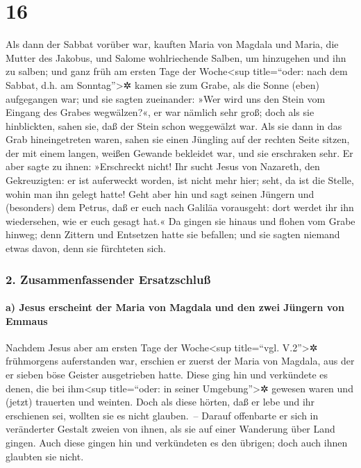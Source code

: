 \hypertarget{section-15}{%
\section{16}\label{section-15}}

 Als dann der Sabbat vorüber war, kauften Maria von
Magdala und Maria, die Mutter des Jakobus, und Salome wohlriechende
Salben, um hinzugehen und ihn zu salben;  und ganz früh am
ersten Tage der Woche\textless sup title=``oder: nach dem Sabbat, d.h.
am Sonntag''\textgreater✲ kamen sie zum Grabe, als die Sonne (eben)
aufgegangen war;  und sie sagten zueinander: »Wer wird uns
den Stein vom Eingang des Grabes wegwälzen?«, er war nämlich sehr groß;
 doch als sie hinblickten, sahen sie, daß der Stein schon
weggewälzt war.  Als sie dann in das Grab hineingetreten
waren, sahen sie einen Jüngling auf der rechten Seite sitzen, der mit
einem langen, weißen Gewande bekleidet war, und sie erschraken sehr.
 Er aber sagte zu ihnen: »Erschreckt nicht! Ihr sucht
Jesus von Nazareth, den Gekreuzigten: er ist auferweckt worden, ist
nicht mehr hier; seht, da ist die Stelle, wohin man ihn gelegt hatte!
 Geht aber hin und sagt seinen Jüngern und (besonders) dem
Petrus, daß er euch nach Galiläa vorausgeht: dort werdet ihr ihn
wiedersehen, wie er euch gesagt hat.«  Da gingen sie
hinaus und flohen vom Grabe hinweg; denn Zittern und Entsetzen hatte sie
befallen; und sie sagten niemand etwas davon, denn sie fürchteten sich.

\hypertarget{zusammenfassender-ersatzschluuxdf}{%
\subsubsection{2. Zusammenfassender
Ersatzschluß}\label{zusammenfassender-ersatzschluuxdf}}

\hypertarget{a-jesus-erscheint-der-maria-von-magdala-und-den-zwei-juxfcngern-von-emmaus}{%
\paragraph{a) Jesus erscheint der Maria von Magdala und den zwei Jüngern
von
Emmaus}\label{a-jesus-erscheint-der-maria-von-magdala-und-den-zwei-juxfcngern-von-emmaus}}

 Nachdem Jesus aber am ersten Tage der Woche\textless sup
title=``vgl. V.2''\textgreater✲ frühmorgens auferstanden war, erschien
er zuerst der Maria von Magdala, aus der er sieben böse Geister
ausgetrieben hatte.  Diese ging hin und verkündete es
denen, die bei ihm\textless sup title=``oder: in seiner
Umgebung''\textgreater✲ gewesen waren und (jetzt) trauerten und weinten.
 Doch als diese hörten, daß er lebe und ihr erschienen
sei, wollten sie es nicht glauben.~--  Darauf offenbarte
er sich in veränderter Gestalt zweien von ihnen, als sie auf einer
Wanderung über Land gingen.  Auch diese gingen hin und
verkündeten es den übrigen; doch auch ihnen glaubten sie nicht.

